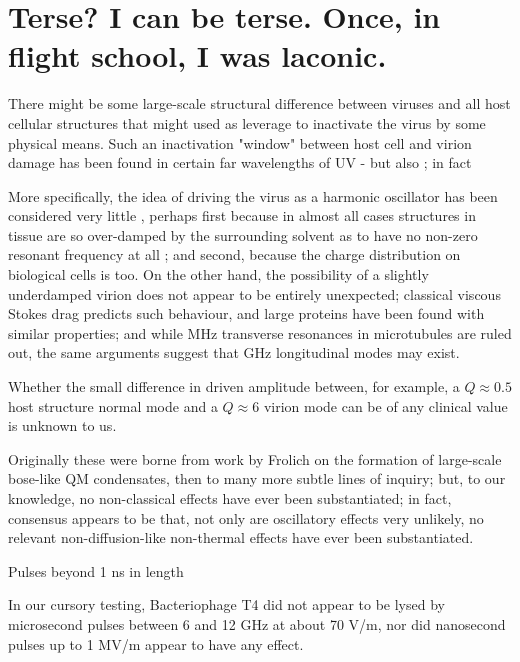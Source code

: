 \documentclass[paper.tex]{subfiles}
\begin{document}
\section{Terse? I can be terse. Once, in flight school, I was laconic.}

There might be some large-scale structural difference between viruses and all host cellular structures that might used as leverage to inactivate the virus by some physical means. Such an inactivation "window" between host cell and virion damage has been found in certain far wavelengths of UV\cite{Germicidal2017} - but also \cite{Use1987a}\cite{Can1993}; in fact 

More specifically, the idea of driving the virus as a harmonic oscillator has been considered very little \cite{Comment2004}, perhaps first because in almost all cases structures in tissue are so over-damped by the surrounding solvent\cite{Vibrational2002}\cite{Biological2002}\cite{Biophysics2000}\cite{Viscous2000} as to have no non-zero resonant frequency at all \cite{dielectric1996}\cite{gabriel1996compilation}; and second, because the charge distribution on biological cells is too. On the other hand, the possibility of a slightly underdamped virion does not appear to be entirely unexpected; classical viscous Stokes drag predicts such behaviour\cite{nature1986}, and large proteins have been found with similar properties\cite{Microwave1994}; and while MHz transverse resonances in microtubules are ruled out\cite{Viscous2000}, the same arguments suggest that GHz longitudinal modes may exist. 

Whether the small difference in driven amplitude between, for example, a $Q\approx0.5$ host structure normal mode and a $Q\approx6$ virion mode can be of any clinical value is unknown to us.

Originally these were borne from work by Frolich on the formation of large-scale bose-like QM condensates, then to many more subtle lines of inquiry; but, to our knowledge, no non-classical effects have ever been substantiated; in fact, consensus appears to be that, not only are oscillatory effects very unlikely, no relevant non-diffusion-like non-thermal effects have ever been substantiated. 


Pulses beyond 1 ns in length \cite{Effect2008} 



In our cursory testing, Bacteriophage T4 did not appear to be lysed by microsecond pulses between 6 and 12 GHz at about 70 V/m, nor did nanosecond pulses up to 1 MV/m appear to have any effect. 
\end{document}
